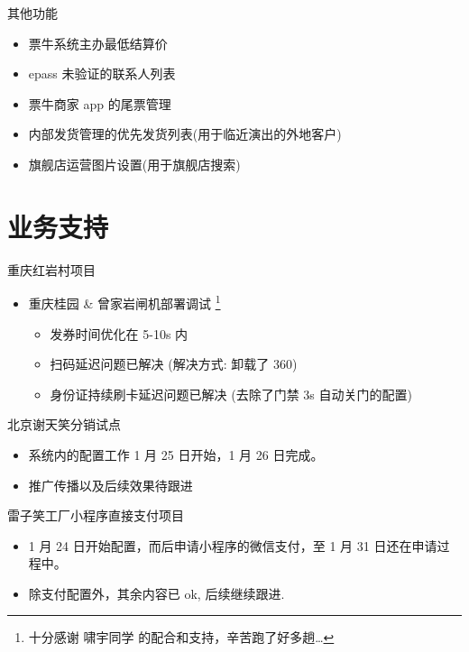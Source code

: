 \documentclass[presentation, bigger]{beamer}
\begin{document}
\begin{frame}[label={sec:org22d8da8}]{其他功能}
\begin{itemize}
\item 票牛系统主办最低结算价
\item epass 未验证的联系人列表
\item 票牛商家 app 的尾票管理
\item 内部发货管理的优先发货列表(用于临近演出的外地客户)
\item 旗舰店运营图片设置(用于旗舰店搜索)
\end{itemize}
\end{frame}

\section{业务支持}
\label{sec:orgcc137cf}
\begin{frame}[label={sec:org2669e82}]{重庆红岩村项目}
\begin{itemize}
\item 重庆桂园 \& 曾家岩闸机部署调试 \footnote{十分感谢 \alert{啸宇同学} 的配合和支持，辛苦跑了好多趟\ldots{}}
\begin{itemize}
\item 发券时间优化在 5-10s 内
\item 扫码延迟问题已解决 (解决方式: 卸载了 360)
\item 身份证持续刷卡延迟问题已解决 (去除了门禁 3s 自动关门的配置)
\end{itemize}
\end{itemize}
\end{frame}

\begin{frame}[label={sec:orgb2361b1}]{北京谢天笑分销试点}
\begin{itemize}
\item 系统内的配置工作 1 月 25 日开始，1 月 26 日完成。
\item 推广传播以及后续效果待跟进
\end{itemize}
\end{frame}

\begin{frame}[label={sec:org3318ef2}]{雷子笑工厂小程序直接支付项目}
\begin{itemize}
\item 1 月 24 日开始配置，而后申请小程序的微信支付，至 1 月 31 日还在申请过程中。
\item 除支付配置外，其余内容已 ok, 后续继续跟进.
\end{itemize}
\end{frame}
\end{document}
